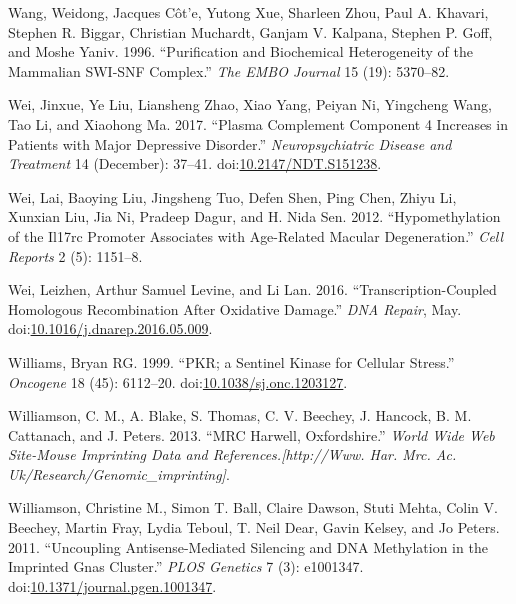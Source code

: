 \documentclass[onehalf,12pt]{beavtex}
\begin{document}
  \hypertarget{ref-WangPurificationbiochemicalheterogeneity1996}{}
  Wang, Weidong, Jacques Côt\a'e, Yutong Xue, Sharleen Zhou, Paul A.
  Khavari, Stephen R. Biggar, Christian Muchardt, Ganjam V. Kalpana,
  Stephen P. Goff, and Moshe Yaniv. 1996. ``Purification and Biochemical
  Heterogeneity of the Mammalian SWI‐SNF Complex.'' \emph{The EMBO
  Journal} 15 (19): 5370--82.
  
  \hypertarget{ref-WeiPlasmacomplementcomponent2017}{}
  Wei, Jinxue, Ye Liu, Liansheng Zhao, Xiao Yang, Peiyan Ni, Yingcheng
  Wang, Tao Li, and Xiaohong Ma. 2017. ``Plasma Complement Component 4
  Increases in Patients with Major Depressive Disorder.''
  \emph{Neuropsychiatric Disease and Treatment} 14 (December): 37--41.
  doi:\href{https://doi.org/10.2147/NDT.S151238}{10.2147/NDT.S151238}.
  
  \hypertarget{ref-WeiHypomethylationIL17RCpromoter2012}{}
  Wei, Lai, Baoying Liu, Jingsheng Tuo, Defen Shen, Ping Chen, Zhiyu Li,
  Xunxian Liu, Jia Ni, Pradeep Dagur, and H. Nida Sen. 2012.
  ``Hypomethylation of the Il17rc Promoter Associates with Age-Related
  Macular Degeneration.'' \emph{Cell Reports} 2 (5): 1151--8.
  
  \hypertarget{ref-WeiTranscriptioncoupledhomologousrecombination2016}{}
  Wei, Leizhen, Arthur Samuel Levine, and Li Lan. 2016.
  ``Transcription-Coupled Homologous Recombination After Oxidative
  Damage.'' \emph{DNA Repair}, May.
  doi:\href{https://doi.org/10.1016/j.dnarep.2016.05.009}{10.1016/j.dnarep.2016.05.009}.
  
  \hypertarget{ref-WilliamsPKRsentinelkinase1999}{}
  Williams, Bryan RG. 1999. ``PKR; a Sentinel Kinase for Cellular
  Stress.'' \emph{Oncogene} 18 (45): 6112--20.
  doi:\href{https://doi.org/10.1038/sj.onc.1203127}{10.1038/sj.onc.1203127}.
  
  \hypertarget{ref-WilliamsonMRCHarwellOxfordshire2013}{}
  Williamson, C. M., A. Blake, S. Thomas, C. V. Beechey, J. Hancock, B. M.
  Cattanach, and J. Peters. 2013. ``MRC Harwell, Oxfordshire.''
  \emph{World Wide Web Site-Mouse Imprinting Data and
  References.{[}http://Www. Har. Mrc. Ac.
  Uk/Research/Genomic\_imprinting{]}}.
  
  \hypertarget{ref-WilliamsonUncouplingAntisenseMediatedSilencing2011a}{}
  Williamson, Christine M., Simon T. Ball, Claire Dawson, Stuti Mehta,
  Colin V. Beechey, Martin Fray, Lydia Teboul, T. Neil Dear, Gavin Kelsey,
  and Jo Peters. 2011. ``Uncoupling Antisense-Mediated Silencing and DNA
  Methylation in the Imprinted Gnas Cluster.'' \emph{PLOS Genetics} 7 (3):
  e1001347.
  doi:\href{https://doi.org/10.1371/journal.pgen.1001347}{10.1371/journal.pgen.1001347}.
  
\end{document}
